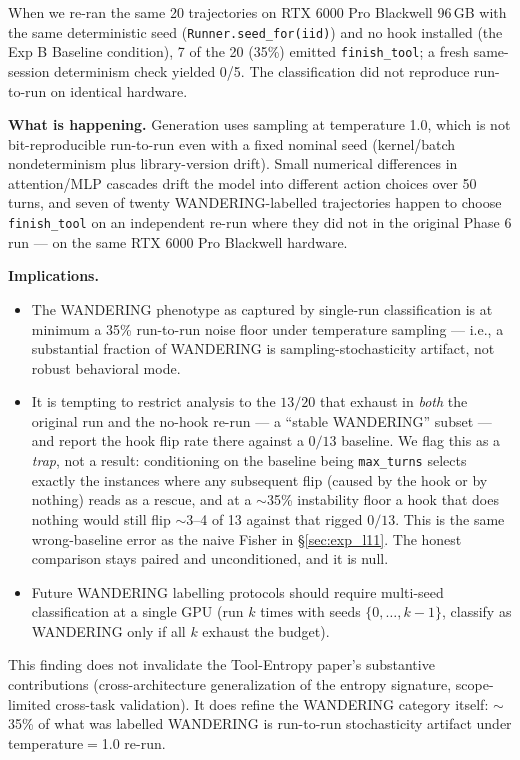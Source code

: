 \documentclass[11pt]{article}
\begin{document}
When we re-ran the same 20 trajectories on RTX 6000 Pro Blackwell 96\,GB with the same deterministic seed (\texttt{Runner.seed\_for(iid)}) and no hook installed (the Exp B Baseline condition), 7 of the 20 (35\%) emitted \texttt{finish\_tool}; a fresh same-session determinism check yielded 0/5. The classification did not reproduce run-to-run on identical hardware.

\textbf{What is happening.} Generation uses sampling at temperature 1.0, which is not bit-reproducible run-to-run even with a fixed nominal seed (kernel/batch nondeterminism plus library-version drift). Small numerical differences in attention/MLP cascades drift the model into different action choices over 50 turns, and seven of twenty WANDERING-labelled trajectories happen to choose \texttt{finish\_tool} on an independent re-run where they did not in the original Phase 6 run --- on the same RTX 6000 Pro Blackwell hardware.

\textbf{Implications.}
\begin{itemize}
\item The WANDERING phenotype as captured by single-run classification is at minimum a 35\% run-to-run noise floor under temperature sampling --- i.e., a substantial fraction of WANDERING is sampling-stochasticity artifact, not robust behavioral mode.
\item It is tempting to restrict analysis to the $13/20$ that exhaust in \emph{both} the original run and the no-hook re-run --- a ``stable WANDERING'' subset --- and report the hook flip rate there against a $0/13$ baseline. We flag this as a \emph{trap}, not a result: conditioning on the baseline being \texttt{max\_turns} selects exactly the instances where any subsequent flip (caused by the hook or by nothing) reads as a rescue, and at a $\sim$35\% instability floor a hook that does nothing would still flip $\sim$3--4 of 13 against that rigged $0/13$. This is the same wrong-baseline error as the naive Fisher in \S\ref{sec:exp_l11}. The honest comparison stays paired and unconditioned, and it is null.
\item Future WANDERING labelling protocols should require multi-seed classification at a single GPU (run $k$ times with seeds $\{0, \ldots, k-1\}$, classify as WANDERING only if all $k$ exhaust the budget).
\end{itemize}

This finding does not invalidate the Tool-Entropy paper's substantive contributions (cross-architecture generalization of the entropy signature, scope-limited cross-task validation). It does refine the WANDERING category itself: $\sim$35\% of what was labelled WANDERING is run-to-run stochasticity artifact under temperature$=$1.0 re-run.
\end{document}
